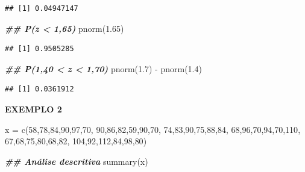 \documentclass[
]{article}
\newenvironment{Shaded}{\begin{snugshade}}{\end{snugshade}}
\newcommand{\DecValTok}[1]{\textcolor[rgb]{0.00,0.00,0.81}{#1}}
\newcommand{\DocumentationTok}[1]{\textcolor[rgb]{0.56,0.35,0.01}{\textbf{\textit{#1}}}}
\newcommand{\FloatTok}[1]{\textcolor[rgb]{0.00,0.00,0.81}{#1}}
\newcommand{\FunctionTok}[1]{\textcolor[rgb]{0.00,0.00,0.00}{#1}}
\newcommand{\NormalTok}[1]{#1}
\newcommand{\OtherTok}[1]{\textcolor[rgb]{0.56,0.35,0.01}{#1}}
\newcommand{\SpecialCharTok}[1]{\textcolor[rgb]{0.00,0.00,0.00}{#1}}
\begin{document}
\begin{verbatim}
## [1] 0.04947147
\end{verbatim}

\begin{Shaded}
\begin{Highlighting}[]
\DocumentationTok{\#\# P(z \textless{} 1,65)}
\FunctionTok{pnorm}\NormalTok{(}\FloatTok{1.65}\NormalTok{)}
\end{Highlighting}
\end{Shaded}

\begin{verbatim}
## [1] 0.9505285
\end{verbatim}

\begin{Shaded}
\begin{Highlighting}[]
\DocumentationTok{\#\# P(1,40 \textless{} z \textless{} 1,70)}
\FunctionTok{pnorm}\NormalTok{(}\FloatTok{1.7}\NormalTok{) }\SpecialCharTok{{-}} \FunctionTok{pnorm}\NormalTok{(}\FloatTok{1.4}\NormalTok{)}
\end{Highlighting}
\end{Shaded}

\begin{verbatim}
## [1] 0.0361912
\end{verbatim}

\textbf{EXEMPLO 2}

\begin{Shaded}
\begin{Highlighting}[]
\NormalTok{x }\OtherTok{=} \FunctionTok{c}\NormalTok{(}\DecValTok{58}\NormalTok{,}\DecValTok{78}\NormalTok{,}\DecValTok{84}\NormalTok{,}\DecValTok{90}\NormalTok{,}\DecValTok{97}\NormalTok{,}\DecValTok{70}\NormalTok{,}
      \DecValTok{90}\NormalTok{,}\DecValTok{86}\NormalTok{,}\DecValTok{82}\NormalTok{,}\DecValTok{59}\NormalTok{,}\DecValTok{90}\NormalTok{,}\DecValTok{70}\NormalTok{,}
      \DecValTok{74}\NormalTok{,}\DecValTok{83}\NormalTok{,}\DecValTok{90}\NormalTok{,}\DecValTok{75}\NormalTok{,}\DecValTok{88}\NormalTok{,}\DecValTok{84}\NormalTok{,}
      \DecValTok{68}\NormalTok{,}\DecValTok{96}\NormalTok{,}\DecValTok{70}\NormalTok{,}\DecValTok{94}\NormalTok{,}\DecValTok{70}\NormalTok{,}\DecValTok{110}\NormalTok{,}
      \DecValTok{67}\NormalTok{,}\DecValTok{68}\NormalTok{,}\DecValTok{75}\NormalTok{,}\DecValTok{80}\NormalTok{,}\DecValTok{68}\NormalTok{,}\DecValTok{82}\NormalTok{,}
      \DecValTok{104}\NormalTok{,}\DecValTok{92}\NormalTok{,}\DecValTok{112}\NormalTok{,}\DecValTok{84}\NormalTok{,}\DecValTok{98}\NormalTok{,}\DecValTok{80}\NormalTok{)}


\DocumentationTok{\#\# Análise descritiva}
\FunctionTok{summary}\NormalTok{(x)}
\end{Highlighting}
\end{Shaded}
\end{document}
